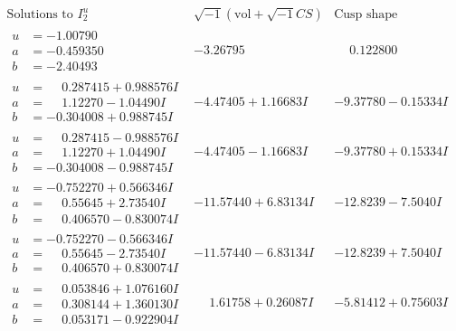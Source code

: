 \documentclass[1p]{elsarticle_modified}
\theoremstyle{definition}
\newcommand{\I}{\sqrt{-1}}
\begin{document}
$$\begin{array}{c|c|c}  
\text{Solutions to }I^u_{2}& \I (\text{vol} + \sqrt{-1}CS) & \text{Cusp shape}\\
 \hline 
\begin{aligned}
u &= -1.00790\phantom{ +0.000000I} \\
a &= -0.459350\phantom{ +0.000000I} \\
b &= -2.40493\phantom{ +0.000000I}\end{aligned}
 & -3.26795\phantom{ +0.000000I} & \phantom{-}0.122800\phantom{ +0.000000I} \\ \hline\begin{aligned}
u &= \phantom{-}0.287415 + 0.988576 I \\
a &= \phantom{-}1.12270 - 1.04490 I \\
b &= -0.304008 + 0.988745 I\end{aligned}
 & -4.47405 + 1.16683 I & -9.37780 - 0.15334 I \\ \hline\begin{aligned}
u &= \phantom{-}0.287415 - 0.988576 I \\
a &= \phantom{-}1.12270 + 1.04490 I \\
b &= -0.304008 - 0.988745 I\end{aligned}
 & -4.47405 - 1.16683 I & -9.37780 + 0.15334 I \\ \hline\begin{aligned}
u &= -0.752270 + 0.566346 I \\
a &= \phantom{-}0.55645 + 2.73540 I \\
b &= \phantom{-}0.406570 - 0.830074 I\end{aligned}
 & -11.57440 + 6.83134 I & -12.8239 - 7.5040 I \\ \hline\begin{aligned}
u &= -0.752270 - 0.566346 I \\
a &= \phantom{-}0.55645 - 2.73540 I \\
b &= \phantom{-}0.406570 + 0.830074 I\end{aligned}
 & -11.57440 - 6.83134 I & -12.8239 + 7.5040 I \\ \hline\begin{aligned}
u &= \phantom{-}0.053846 + 1.076160 I \\
a &= \phantom{-}0.308144 + 1.360130 I \\
b &= \phantom{-}0.053171 - 0.922904 I\end{aligned}
 & \phantom{-}1.61758 + 0.26087 I & -5.81412 + 0.75603 I \\ \hline\begin{aligned}

\end{aligned}
\end{array}$$
\end{document}
